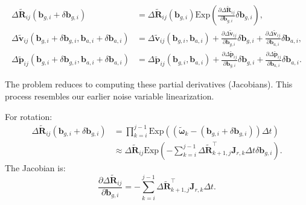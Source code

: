 \begin{equation}\label{eq:update-bias}
	\begin{aligned}
		\Delta \tilde{\mathbf{R}}_{ij}(\mathbf{b}_{g,i} + \delta \mathbf{b}_{g,i}) &= \Delta 
		\tilde{\mathbf{R}}_{ij}(\mathbf{b}_{g,i}) \mathrm{Exp} \left(\frac{\partial \Delta \tilde{\mathbf{R}}_{ij}}{\partial 
			\mathbf{b}_{g,i}} \delta \mathbf{b}_{g,i}\right), \\
		\Delta \tilde{\mathbf{v}}_{ij} (\mathbf{b}_{g,i} + \delta \mathbf{b}_{g,i}, \mathbf{b}_{a,i} + \delta \mathbf{b}_{a,i}) &= 
		\Delta \tilde{\mathbf{v}}_{ij}(\mathbf{b}_{g,i}, \mathbf{b}_{a,i}) + \frac{\partial \Delta 
			\tilde{\mathbf{v}}_{ij}}{\partial \mathbf{b}_{g,i}} \delta \mathbf{b}_{g,i} + \frac{\partial \Delta 
			\tilde{\mathbf{v}}_{ij}}{\partial \mathbf{b}_{a,i}} \delta \mathbf{b}_{a,i}, \\
		\Delta \tilde{\mathbf{p}}_{ij} (\mathbf{b}_{g,i} + \delta \mathbf{b}_{g,i}, \mathbf{b}_{a,i} + \delta \mathbf{b}_{a,i}) &= 
		\Delta \tilde{\mathbf{p}}_{ij}(\mathbf{b}_{g,i}, \mathbf{b}_{a,i}) + \frac{\partial \Delta 
			\tilde{\mathbf{p}}_{ij}}{\partial \mathbf{b}_{g,i}} \delta \mathbf{b}_{g,i} + \frac{\partial \Delta 
			\tilde{\mathbf{p}}_{ij}}{\partial \mathbf{b}_{a,i}} \delta \mathbf{b}_{a,i}.
	\end{aligned}
\end{equation}

The problem reduces to computing these partial derivatives (Jacobians). This process resembles our earlier noise variable linearization.

For rotation:
\begin{equation}\label{key}
	\begin{aligned}
		\Delta \tilde{\mathbf{R}}_{ij} (\mathbf{b}_{g,i} + \delta \mathbf{b}_{g,i}) &= \prod_{k=i}^{j-1} \mathrm{Exp} 
		\left((\tilde{\boldsymbol{\omega}}_k - (\mathbf{b}_{g,i} + \delta \mathbf{b}_{g,i})) \Delta t \right) \\
		&\approx \Delta \tilde{\mathbf{R}}_{ij} \mathrm{Exp} \left( -\sum_{k=i}^{j-1} \Delta 
		\tilde{\mathbf{R}}_{k+1, j}^\top \mathbf{J}_{r,k} \Delta t \delta \mathbf{b}_{g,i}  \right).
	\end{aligned}
\end{equation}
The Jacobian is:
\begin{equation}\label{key}
	\frac{\partial \Delta \tilde{\mathbf{R}}_{ij}}{\partial \mathbf{b}_{g,i}} = -\sum_{k=i}^{j-1} \Delta 
	\tilde{\mathbf{R}}_{k+1, j}^\top \mathbf{J}_{r,k} \Delta t.
\end{equation}


